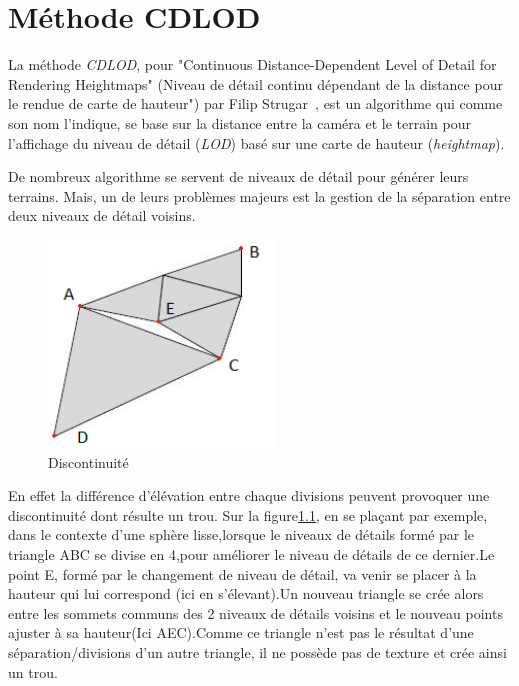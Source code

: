 \chapter{Méthode CDLOD}
  \label{chap:cdlod}

  La méthode \emph{CDLOD}, pour "Continuous Distance-Dependent Level of Detail for Rendering Heightmaps" (Niveau de détail continu dépendant de la distance pour le rendue de carte de hauteur") par Filip Strugar~\cite{CDLOD}, 
  est un algorithme qui comme son nom l'indique, se base sur la distance entre la caméra et le terrain pour l'affichage du niveau de détail 
  (\textit{LOD}) basé sur une carte de hauteur (\emph{heightmap}).

  De nombreux algorithme se servent de niveaux de détail pour générer leurs terrains. Mais, un de leurs problèmes majeurs est la gestion de la séparation entre deux niveaux de détail voisins.
  
 \begin{figure}
 \includegraphics[width=6cm]{img/cracks.png}
   \caption[Discontinuité]{Discontinuité\protect\footnotemark}
   \label{fig:cracks}
 \end{figure}
 
 \vspace{0.1cm}
 En effet la différence d'élévation entre chaque divisions peuvent provoquer une discontinuité dont résulte un trou. Sur la figure\ref{fig:cracks}, en se plaçant par exemple, dans le contexte d'une sphère lisse,lorsque le niveaux de détails formé par le triangle ABC se divise en 4,pour améliorer le niveau de détails de ce dernier.Le point E, formé par le changement de niveau de détail, va venir se placer à la hauteur qui lui correspond (ici en s'élevant).Un nouveau triangle se crée alors entre les sommets communs des 2 niveaux de détails voisins et le nouveau points ajuster à sa hauteur(Ici AEC).Comme ce triangle n'est pas le résultat d'une séparation/divisions d'un autre triangle, il ne possède pas de texture et crée ainsi un trou.\\
 
